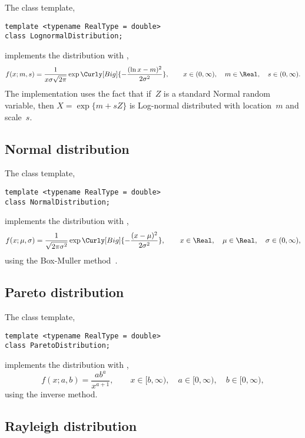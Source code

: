 The class template,
\begin{verbatim}
template <typename RealType = double>
class LognormalDistribution;
\end{verbatim}
implements the distribution with \pdf,
\begin{equation*}
  f(x;m,s) =
  \frac{1}{x\sigma\sqrt{2\pi}}
  \exp\Curly[Big]{-\frac{(\ln x - m)^2}{2\sigma^2}},\qquad
  x \in (0, \infty),\quad m \in \Real,\quad s \in (0, \infty).
\end{equation*}
The implementation uses the fact that if~$Z$ is a standard Normal random
variable, then $X = \exp\{m + sZ\}$ is Log-normal distributed with location~$m$
and scale~$s$.

\subsection{Normal distribution}
\label{sub:Normal distribution}

The class template,
\begin{verbatim}
template <typename RealType = double>
class NormalDistribution;
\end{verbatim}
implements the distribution with \pdf,
\begin{equation*}
  f(x;\mu,\sigma) =
  \frac{1}{\sqrt{2\pi\sigma^2}}
  \exp\Curly[Big]{-\frac{(x-\mu)^2}{2\sigma^2}},\qquad
  x \in \Real,\quad \mu \in \Real,\quad \sigma \in (0, \infty),
\end{equation*}
using the Box-Muller method~\cite{Box:1958hv}.

\subsection{Pareto distribution}
\label{sub:Pareto distribution}

The class template,
\begin{verbatim}
template <typename RealType = double>
class ParetoDistribution;
\end{verbatim}
implements the distribution with \pdf,
\begin{equation*}
  f(x;a,b) = \frac{a b^a}{x^{a + 1}},\qquad
  x \in [b, \infty),\quad a \in [0, \infty),\quad b \in [0, \infty),
\end{equation*}
using the inverse method.

\subsection{Rayleigh distribution}
\label{sub:Rayleigh distribution}

